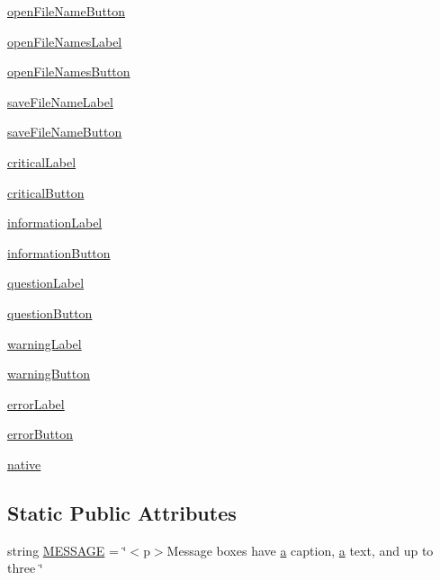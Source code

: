 \begin{DoxyCompactItemize}
\item 
\hyperlink{classstandarddialogs_1_1Dialog_ac536f711204e0c921b4bc63c405aa13d}{open\+File\+Name\+Button}
\item 
\hyperlink{classstandarddialogs_1_1Dialog_a4b3a7ac34639b7d92bcd82e8e9d1b880}{open\+File\+Names\+Label}
\item 
\hyperlink{classstandarddialogs_1_1Dialog_ae99ea954f0c339ef19d2ecc782163438}{open\+File\+Names\+Button}
\item 
\hyperlink{classstandarddialogs_1_1Dialog_a5f97eeab8e82210981a010e4e2547421}{save\+File\+Name\+Label}
\item 
\hyperlink{classstandarddialogs_1_1Dialog_a5ef3485e664e932da15ee8cce14b24a9}{save\+File\+Name\+Button}
\item 
\hyperlink{classstandarddialogs_1_1Dialog_ad490d080317e6a6d39ea75278b856753}{critical\+Label}
\item 
\hyperlink{classstandarddialogs_1_1Dialog_a414c932ebb17c19087e05df95782e08f}{critical\+Button}
\item 
\hyperlink{classstandarddialogs_1_1Dialog_a1296a460aea24257cce8e14db3f9ab03}{information\+Label}
\item 
\hyperlink{classstandarddialogs_1_1Dialog_ad3e8c0fa84e2fdd22a532b94e6ccdcb3}{information\+Button}
\item 
\hyperlink{classstandarddialogs_1_1Dialog_a3fdf07cb3801784ad45e458bdfeaf206}{question\+Label}
\item 
\hyperlink{classstandarddialogs_1_1Dialog_a3ad6b4f4e4823aa1de9f17f6d8b23169}{question\+Button}
\item 
\hyperlink{classstandarddialogs_1_1Dialog_ac572b8599da899f5cd5fd383f03a781b}{warning\+Label}
\item 
\hyperlink{classstandarddialogs_1_1Dialog_a86de91bb464072d4b2120f83d6338b93}{warning\+Button}
\item 
\hyperlink{classstandarddialogs_1_1Dialog_ac6fe353f39adeaa599fcbb8d6256f2e2}{error\+Label}
\item 
\hyperlink{classstandarddialogs_1_1Dialog_a1c4e42d868fad83097b680ebe65cdd61}{error\+Button}
\item 
\hyperlink{classstandarddialogs_1_1Dialog_a3661958f7d733a390ea266f08f5e0ba0}{native}
\end{DoxyCompactItemize}
\subsection*{Static Public Attributes}
\begin{DoxyCompactItemize}
\item 
string \hyperlink{classstandarddialogs_1_1Dialog_a6608bbf30ea68a3bacc93a95d59ba9a1}{M\+E\+S\+S\+A\+G\+E} = \char`\"{}$<$p$>$Message boxes have \hyperlink{gen__mat5files_8m_aae328bf20413f220e38aec4d95bfd6da}{a} caption, \hyperlink{gen__mat5files_8m_aae328bf20413f220e38aec4d95bfd6da}{a} text, and up to three \char`\"{}
\end{DoxyCompactItemize}


